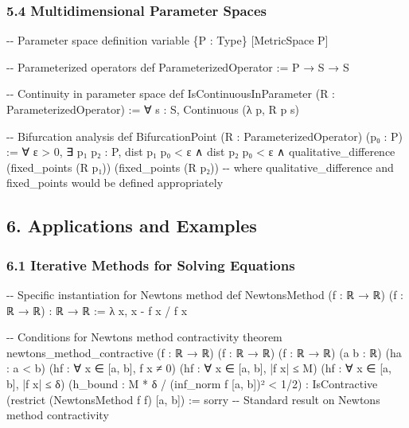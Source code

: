 \documentclass[
]{article}
\newenvironment{Shaded}{}{}
\newcommand{\NormalTok}[1]{#1}
\begin{document}
\subsubsection{5.4 Multidimensional Parameter
Spaces}\label{multidimensional-parameter-spaces}

\begin{Shaded}
\begin{Highlighting}[]
\NormalTok{{-}{-} Parameter space definition}
\NormalTok{variable \{P : Type\} [MetricSpace P]}

\NormalTok{{-}{-} Parameterized operators}
\NormalTok{def ParameterizedOperator := P → S → S}

\NormalTok{{-}{-} Continuity in parameter space}
\NormalTok{def IsContinuousInParameter (R : ParameterizedOperator) :=}
\NormalTok{  ∀ s : S, Continuous (λ p, R p s)}

\NormalTok{{-}{-} Bifurcation analysis}
\NormalTok{def BifurcationPoint (R : ParameterizedOperator) (p₀ : P) :=}
\NormalTok{  ∀ ε \textgreater{} 0, ∃ p₁ p₂ : P, dist p₁ p₀ \textless{} ε ∧ dist p₂ p₀ \textless{} ε ∧}
\NormalTok{  qualitative\_difference (fixed\_points (R p₁)) (fixed\_points (R p₂))}
\NormalTok{  {-}{-} where qualitative\_difference and fixed\_points would be defined appropriately}
\end{Highlighting}
\end{Shaded}

\subsection{6. Applications and
Examples}\label{applications-and-examples}

\subsubsection{6.1 Iterative Methods for Solving
Equations}\label{iterative-methods-for-solving-equations}

\begin{Shaded}
\begin{Highlighting}[]
\NormalTok{{-}{-} Specific instantiation for Newton\textquotesingle{}s method}
\NormalTok{def NewtonsMethod (f : ℝ → ℝ) (f\textquotesingle{} : ℝ → ℝ) : ℝ → ℝ :=}
\NormalTok{  λ x, x {-} f x / f\textquotesingle{} x}

\NormalTok{{-}{-} Conditions for Newton\textquotesingle{}s method contractivity}
\NormalTok{theorem newtons\_method\_contractive}
\NormalTok{  (f : ℝ → ℝ) (f\textquotesingle{} : ℝ → ℝ) (f\textquotesingle{}\textquotesingle{} : ℝ → ℝ) (a b : ℝ) (ha : a \textless{} b)}
\NormalTok{  (hf\textquotesingle{} : ∀ x ∈ [a, b], f\textquotesingle{} x ≠ 0)}
\NormalTok{  (hf\textquotesingle{}\textquotesingle{} : ∀ x ∈ [a, b], |f\textquotesingle{}\textquotesingle{} x| ≤ M)}
\NormalTok{  (hf : ∀ x ∈ [a, b], |f x| ≤ δ)}
\NormalTok{  (h\_bound : M * δ / (inf\_norm f\textquotesingle{} [a, b])² \textless{} 1/2) :}
\NormalTok{  IsContractive (restrict (NewtonsMethod f f\textquotesingle{}) [a, b]) :=}
\NormalTok{  sorry {-}{-} Standard result on Newton\textquotesingle{}s method contractivity}
\end{Highlighting}
\end{Shaded}
\end{document}
